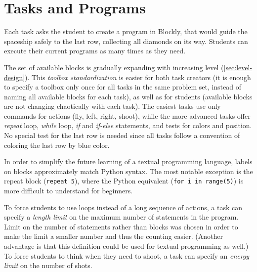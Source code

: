 \section{Tasks and Programs}
\label{sec:robomission.programs}

Each task asks the student to create a program in Blockly,
that would guide the spaceship safely to the last row,
collecting all diamonds on its way. %
Students can execute their current programs as many times
as they need. %

The set of available blocks is gradually expanding with
increasing level (\cref{sec:level-design}). This \emph{toolbox standardization}
is easier for both task creators (it is enough to specify
a toolbox only once for all tasks in the same problem set,
instead of naming all available blocks for each task),
as well as for  students
(available blocks are not changing chaotically with each task).
The easiest tasks use only commands for actions (fly, left, right, shoot),
while the more advanced tasks offer \emph{repeat} loop, \emph{while} loop,
\emph{if} and \emph{if-else} statements,
and tests for colors and position.
No special test for the last row is needed since all tasks follow a convention
of coloring the last row by blue color.

In order to simplify the future learning of a textual programming language,
labels on blocks approximately match Python syntax. %
The most notable exception is the repeat block (\texttt{repeat 5}),
where the Python equivalent (\texttt{for i in range(5)}) is more difficult
to understand for beginners.

To force students to use loops instead of a long sequence of actions,
a task can specify a \emph{length limit}
on the maximum number of statements in the program.
Limit on the number of statements rather than blocks was chosen in
order to make the limit a smaller number and thus the counting easier.
(Another advantage is that this definition could be used for textual
programming as well.)
To force students to think when they need to shoot, a task can specify
an \emph{energy limit} on the number of shots.

